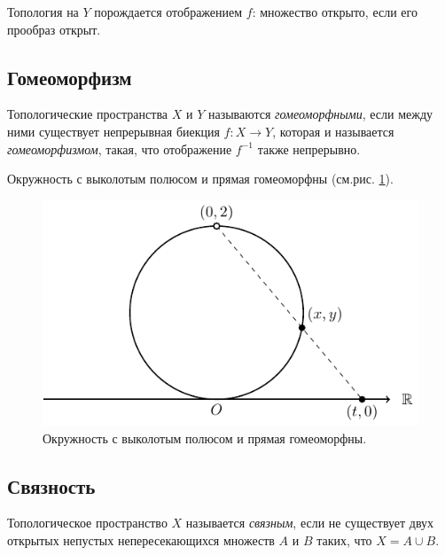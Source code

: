 \begin{remark}
    Топология на $Y$ порождается отображением $f$: множество открыто, если его прообраз открыт.
\end{remark}

\subsection{Гомеоморфизм}
\begin{definition}
    Топологические пространства $X$ и $Y$ называются \textit{гомеоморфными}, если между ними существует непрерывная биекция $f: X \to Y$, которая и называется \textit{гомеоморфизмом}, такая, что отображение $f^{-1}$ также непрерывно.
\end{definition}


\begin{example}
    Окружность с выколотым полюсом и прямая гомеоморфны (см.рис. \ref{fig:c1.1}).
\end{example}

\begin{figure}
    \centering
    \includegraphics{images/c1.1.pdf}
    \caption{Окружность с выколотым полюсом и прямая гомеоморфны.}
    \label{fig:c1.1}
\end{figure}


\subsection{Связность}
\begin{definition}
    Топологическое пространство $X$ называется \textit{связным}, если не существует двух открытых непустых непересекающихся множеств $A$ и $B$ таких, что $X = A \cup B$.
\end{definition}

